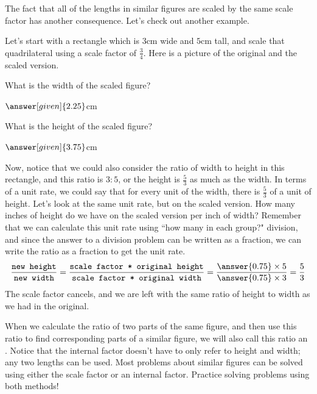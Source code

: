 \documentclass{ximera}
\begin{document}
The fact that all of the lengths in similar figures are scaled by the same scale factor has another consequence. Let's check out another example.

\begin{example}
Let's start with a rectangle which is $3$cm wide and $5$cm tall, and scale that quadrilateral using a scale factor of $\frac{3}{4}$. Here is a picture of the original and the scaled version.

\begin{image}
\end{image}



What is the width of the scaled figure? \begin{prompt}$\answer[given]{2.25}$cm\end{prompt}

What is the height of the scaled figure? \begin{prompt}$\answer[given]{3.75}$cm \end{prompt}



Now, notice that we could also consider the ratio of width to height in this rectangle, and this ratio is $3:5$, or the height is $\frac53$ as much as the width. In terms of a unit rate, we could say that for every unit of the width, there is $\frac53$ of a unit of height. Let's look at the same unit rate, but on the scaled version. How many inches of height do we have on the scaled version per inch of width? Remember that we can calculate this unit rate using ``how many in each group?" division, and since the answer to a division problem can be written as a fraction, we can write the ratio as a fraction to get the unit rate.
\[
\frac{\texttt{new height}}{\texttt{new width}} = \frac{\texttt{scale factor * original height}}{\texttt{scale factor * original width}} = \frac{\answer{0.75}\times 5}{\answer{0.75} \times 3} = \frac{5}{3}
\]
The scale factor cancels, and we are left with the same ratio of height to width as we had in the original.

\end{example}
When we calculate the ratio of two parts of the same figure, and then use this ratio to find corresponding parts of a similar figure, we will also call this ratio an . Notice that the internal factor doesn't have to only refer to height and width; any two lengths can be used. Most problems about similar figures can be solved using either the scale factor or an internal factor. Practice solving problems using both methods!
\end{document}
